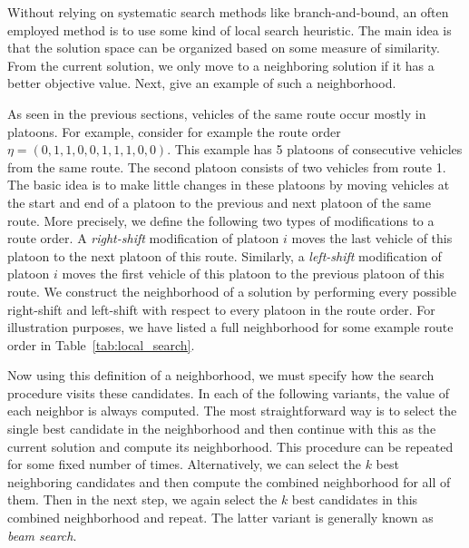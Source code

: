 \documentclass[a4paper]{report}
\theoremstyle{definition}
\theoremstyle{plain}
\begin{document}
Without relying on systematic search methods like branch-and-bound, an often
employed method is to use some kind of local search heuristic.
%
The main idea is that the solution space can be organized based on some measure
of similarity. From the current solution, we only move to a neighboring solution
if it has a better objective value.
%
Next, give an example of such a neighborhood.

As seen in the previous sections, vehicles of the same route occur mostly in
platoons. For example, consider for example the route order
$\eta = (0, 1, 1, 0, 0, 1, 1, 1, 0, 0)$. This example has 5 platoons of
consecutive vehicles from the same route. The second platoon consists of two
vehicles from route 1.
The basic idea is to make little changes in these platoons by moving vehicles at
the start and end of a platoon to the previous and next platoon of the same
route.
%
More precisely, we define the following two types of modifications to a route
order. A \textit{right-shift} modification of platoon $i$ moves the last vehicle of this
platoon to the next platoon of this route. Similarly, a \textit{left-shift} modification
of platoon $i$ moves the first vehicle of this platoon to the previous platoon
of this route.
%
We construct the neighborhood of a solution by performing every possible
right-shift and left-shift with respect to every platoon in the route order. For
illustration purposes, we have listed a full neighborhood for some example route
order in Table~\ref{tab:local_search}.

Now using this definition of a neighborhood, we must specify how the search
procedure visits these candidates.
In each of the following variants, the value of each neighbor is always computed.
%
The most straightforward way is to select the single best candidate in the
neighborhood and then continue with this as the current solution and compute its
neighborhood. This procedure can be repeated for some fixed number of times.
Alternatively, we can select the $k$ best neighboring candidates and then
compute the combined neighborhood for all of them. Then in the next step, we
again select the $k$ best candidates in this combined neighborhood and repeat.
The latter variant is generally known as \textit{beam search}.

\newcommand*{\one}{{\color{blue}1}}%
\newcommand*{\zero}{{\color{red}0}}%
\end{document}

